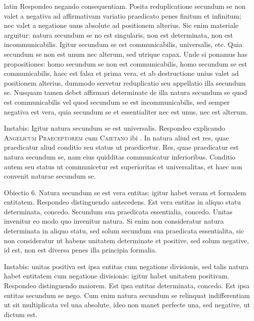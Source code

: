 \begin{otherlanguage*}{latin}
\pstart
 Respondeo negando consequentiam. Posita reduplicatione secundum se non valet a negativa ad affirmativam variatio praedicato penes finitum et infinitum; nec valet a negatione unus absolute ad positionem alterius. Sic enim materiale arguitur: natura secundum se no est singularis, non est determinata, non est incommunicabilis. Igitur secundum se est communicabilis, universalis, etc. Quia secundum se non est unum nec alterum, sed utrique capax. Unde si ponamus has propositiones: homo secundum se non est communicabilis, homo secundum se est communicabilis, haec est falsa et prima vera, et ab destructione unius valet ad positionem alterius, dummodo servetur reduplicatio seu appellatio illa secundum se. Nusquam tamen debet affirmari determinate de illa natura secundum se quod est communicabilis vel quod secundum se est incommunicabilis, sed semper negativa est vera, quia secundum se et essentialiter nec est unus, nec est alterum. 
\pend

\pstart
 Instabis:  Igitur natura secundum se est universalis. Respondeo explicando \textsc{Angelicum Praeceptorem} cum \textsc{Caietano} ibi . In natura aliud est res, quae praedicatur aliud conditio seu status ut praedicetur. Res, quae praedicatur est natura secundum se, nam eius quidditas communicatur inferioribus. Conditio autem seu status ut communicetur est superioritas et universalitas, et haec non convenit naturae secundum se. 
\pend

\pstart
 Obiectio 6. Natura secundum se est vera entitas: igitur habet veram et formalem entitatem. Respondeo distinguendo antecedens. Est vera entitas in aliquo statu determinata, concedo. Secundum sua praedicata essentialia, concedo. Unitas invenitur eo modo quo invenitur natura. Si enim non consideratur natura determinata in aliquo statu, sed solum secundum sua praedicata essentialita, sic non consideratur ut habens unitatem determinate et positive, sed solum negative, id est, non est diversa penes illa principia formalia. 
\pend

\pstart
 Instabis: unitas positiva est ipsa entitas cum negatione divisionis, sed talis natura habet entitatem cum negatione divisionis: igitur habet unitatem positivam. Respondeo distinguendo maiorem. Est ipsa entitas determinata, concedo. Est ipsa entitas secundum se nego. Cum enim natura secundum se relinquat indifferentiam ut sit multiplicata vel una absolute, ideo non manet perfecte una, sed negative, ut dictum est. 
\pend


\end{otherlanguage*}
